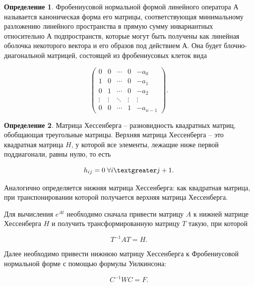 \documentclass[master, och, diploma, times]{sty/SCWorks}
\theoremstyle{plain}
\theoremstyle{definition}
\newtheorem{defn}{Определение}[section]
\numberwithin{equation}{section}
\begin{document}
\begin{defn}
Фробениусовой нормальной формой линейного оператора $А$ называется каноническая форма его матрицы, соответствующая минимальному разложению линейного пространства в прямую сумму инвариантных относительно $А$ подпространств, которые могут быть получены как линейная оболочка некоторого вектора и его образов под действием $А$. Она будет блочно-диагональной матрицей, состоящей из фробениусовых клеток вида

\begin{equation}
\begin{pmatrix}
0&0&\cdots&0&-a_0\\
1&0&\cdots&0&-a_1\\
0&1&\cdots&0&-a_2\\
\vdots&\vdots&\ddots&\vdots&\vdots\\
0&0&\cdots&1&-a_{n-1}
\end{pmatrix}.
\end{equation}

\end{defn}

\begin{defn}
Матрица Хессенберга -- разновидность квадратных матриц, обобщающая треугольные матрицы. Верхняя матрица Хессенберга -- это квадратная матрица ${\displaystyle H}$, у которой все элементы, лежащие ниже первой поддиагонали, равны нулю, то есть

\begin{equation}
h_{ij}=0 \; \forall i \textgreater j+1.
\end{equation}

\noindent Аналогично определяется нижняя матрица Хессенберга: как квадратная матрица, при транспонировании которой получается верхняя матрица Хессенберга\cite{bib:ode:1}.
\end{defn}


Для вычисления $e^{At}$ необходимо сначала привести матрицу $A$ к нижней матрице Хессенберга $H$ и получить трансформированную матрицу $T$ такую, при которой

\begin{equation}
T^{-1}AT=H.
\end{equation}

\noindent Далее необходимо привести нижнюю матрицу Хессенберга к Фробениусовой нормальной форме с помощью формулы Уилкинсона:

\begin{equation}
C^{-1}WC=F.
\end{equation}
\end{document}
